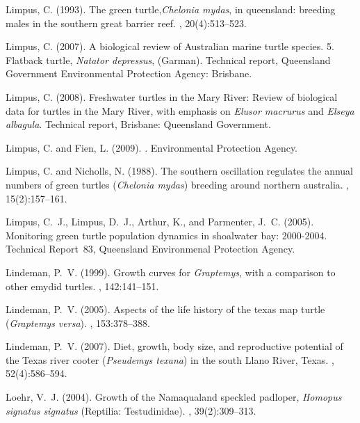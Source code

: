 \documentclass{article}
\begin{document}
\begin{thebibliography}{}
Limpus, C. (1993).
\newblock The green turtle,\emph{Chelonia mydas}, in queensland: breeding males
  in the southern great barrier reef.
, 20(4):513--523.

Limpus, C. (2007).
\newblock A biological review of {A}ustralian marine turtle species. 5.
  {F}latback turtle, \textit{Natator depressus}, ({G}arman).
\newblock Technical report, Queensland Government Environmental Protection
  Agency: Brisbane.

Limpus, C. (2008).
\newblock Freshwater turtles in the {M}ary {R}iver: {R}eview of biological data
  for turtles in the {M}ary {R}iver, with emphasis on \emph{Elusor macrurus}
  and \emph{Elseya albagula}.
\newblock Technical report, Brisbane: Queensland Government.

Limpus, C. and Fien, L. (2009).
.
\newblock Environmental Protection Agency.

Limpus, C. and Nicholls, N. (1988).
\newblock The southern oscillation regulates the annual numbers of green
  turtles (\emph{Chelonia mydas}) breeding around northern australia.
, 15(2):157--161.

Limpus, C.~J., Limpus, D.~J., Arthur, K., and Parmenter, J.~C. (2005).
\newblock Monitoring green turtle population dynamics in shoalwater bay:
  2000-2004.
\newblock Technical Report~83, Queensland Environmenal Protection Agency.

Lindeman, P.~V. (1999).
\newblock Growth curves for \emph{Graptemys}, with a comparison to other emydid
  turtles.
, 142:141--151.

Lindeman, P.~V. (2005).
\newblock Aspects of the life history of the texas map turtle (\emph{Graptemys
  versa}).
, 153:378--388.

Lindeman, P.~V. (2007).
\newblock Diet, growth, body size, and reproductive potential of the {T}exas
  river cooter (\emph{Pseudemys texana}) in the south {L}lano {R}iver, {T}exas.
, 52(4):586--594.

Loehr, V.~J. (2004).
\newblock Growth of the {N}amaqualand speckled padloper, \emph{Homopus signatus
  signatus} ({R}eptilia: {T}estudinidae).
, 39(2):309--313.


\end{thebibliography}
\end{document}
